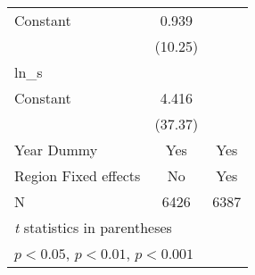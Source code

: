 {\begin{longtable}{l*{2}{c}}
Constant            &       0.939\sym{***}&                     \\
                    &     (10.25)         &                     \\
\hline
ln\_s                &                     &                     \\
Constant            &       4.416\sym{***}&                     \\
                    &     (37.37)         &                     \\
[1em]
Year Dummy          &         Yes         &         Yes         \\
\hline
Region Fixed effects&          No         &         Yes         \\
N                   &        6426         &        6387         \\
\hline\hline
\multicolumn{3}{l}{\footnotesize \textit{t} statistics in parentheses}\\
\multicolumn{3}{l}{\footnotesize \sym{*} \(p<0.05\), \sym{**} \(p<0.01\), \sym{***} \(p<0.001\)}\\
\end{longtable}
}
